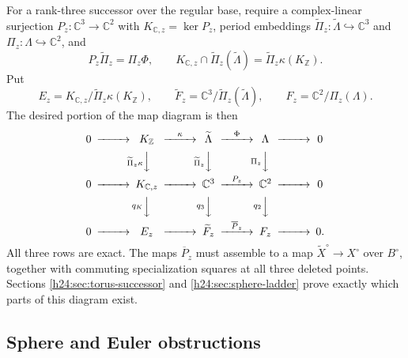For a rank-three successor over the regular base, require a complex-linear
surjection $P_z:\mathbb C^3\to\mathbb C^2$ with $K_{\mathbb C,z}=\ker P_z$, period embeddings
$\widetilde\Pi_z:\widetilde\Lambda\hookrightarrow\mathbb C^3$ and
$\Pi_z:\Lambda\hookrightarrow\mathbb C^2$, and
\[
 P_z\widetilde\Pi_z=\Pi_z\Phi,\qquad
 K_{\mathbb C,z}\cap\widetilde\Pi_z(\widetilde\Lambda)
 =\widetilde\Pi_z\kappa(K_\mathbb Z).
\]
Put
\[
 E_z=K_{\mathbb C,z}/\widetilde\Pi_z\kappa(K_\mathbb Z),\qquad
 \widetilde F_z=\mathbb C^3/\widetilde\Pi_z(\widetilde\Lambda),\qquad
 F_z=\mathbb C^2/\Pi_z(\Lambda).
\]
The desired portion of the map diagram is then
\begin{equation}
\begin{CD}
0@>>>K_\mathbb Z@>{\kappa}>>\widetilde\Lambda@>{\Phi}>>\Lambda@>>>0\\
@.@V{\widetilde\Pi_z\kappa}VV@V{\widetilde\Pi_z}VV@V{\Pi_z}VV@.\\
0@>>>K_{\mathbb C,z}@>>>\mathbb C^3@>{P_z}>>\mathbb C^2@>>>0\\
@.@V{q_K}VV@V{q_3}VV@V{q_2}VV@.\\
0@>>>E_z@>>>\widetilde F_z@>{\overline P_z}>>F_z@>>>0.
\end{CD}
\label{h24:eq:required-diagram}
\end{equation}
All three rows are exact.  The maps $\overline P_z$ must assemble to a map
$\widetilde X^\circ\to X^\circ$ over $B^\circ$, together with commuting
specialization squares at all three deleted points.
Sections \ref{h24:sec:torus-successor} and \ref{h24:sec:sphere-ladder} prove exactly
which parts of this diagram exist.

\subsection{Sphere and Euler obstructions}



